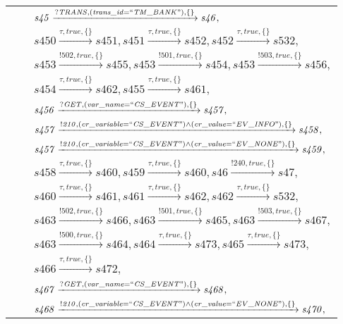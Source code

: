 \begin{tabular}{lcp{350px}}
& & $\mathit{s45}\xrightarrow{\mathit{?TRANS}, \mathit{(trans\_id = ``TM\_BANK")}, \{\}}\mathit{s46},$ \\
& & $\mathit{s450}\xrightarrow{\mathit{\tau}, \mathit{true}, \{\}}\mathit{s451},\mathit{s451}\xrightarrow{\mathit{\tau}, \mathit{true}, \{\}}\mathit{s452},\mathit{s452}\xrightarrow{\mathit{\tau}, \mathit{true}, \{\}}\mathit{s532},$ \\
& & $\mathit{s453}\xrightarrow{\mathit{!502}, \mathit{true}, \{\}}\mathit{s455},\mathit{s453}\xrightarrow{\mathit{!501}, \mathit{true}, \{\}}\mathit{s454},\mathit{s453}\xrightarrow{\mathit{!503}, \mathit{true}, \{\}}\mathit{s456},$ \\
& & $\mathit{s454}\xrightarrow{\mathit{\tau}, \mathit{true}, \{\}}\mathit{s462},\mathit{s455}\xrightarrow{\mathit{\tau}, \mathit{true}, \{\}}\mathit{s461},$ \\
& & $\mathit{s456}\xrightarrow{\mathit{?GET}, \mathit{(var\_name = ``CS\_EVENT")}, \{\}}\mathit{s457},$ \\
& & $\mathit{s457}\xrightarrow{\mathit{!210}, \mathit{(cr\_variable = ``CS\_EVENT") \land (cr\_value = ``EV\_INFO")}, \{\}}\mathit{s458},$ \\
& & $\mathit{s457}\xrightarrow{\mathit{!210}, \mathit{(cr\_variable = ``CS\_EVENT") \land (cr\_value = ``EV\_NONE")}, \{\}}\mathit{s459},$ \\
& & $\mathit{s458}\xrightarrow{\mathit{\tau}, \mathit{true}, \{\}}\mathit{s460},\mathit{s459}\xrightarrow{\mathit{\tau}, \mathit{true}, \{\}}\mathit{s460},\mathit{s46}\xrightarrow{\mathit{!240}, \mathit{true}, \{\}}\mathit{s47},$ \\
& & $\mathit{s460}\xrightarrow{\mathit{\tau}, \mathit{true}, \{\}}\mathit{s461},\mathit{s461}\xrightarrow{\mathit{\tau}, \mathit{true}, \{\}}\mathit{s462},\mathit{s462}\xrightarrow{\mathit{\tau}, \mathit{true}, \{\}}\mathit{s532},$ \\
& & $\mathit{s463}\xrightarrow{\mathit{!502}, \mathit{true}, \{\}}\mathit{s466},\mathit{s463}\xrightarrow{\mathit{!501}, \mathit{true}, \{\}}\mathit{s465},\mathit{s463}\xrightarrow{\mathit{!503}, \mathit{true}, \{\}}\mathit{s467},$ \\
& & $\mathit{s463}\xrightarrow{\mathit{!500}, \mathit{true}, \{\}}\mathit{s464},\mathit{s464}\xrightarrow{\mathit{\tau}, \mathit{true}, \{\}}\mathit{s473},\mathit{s465}\xrightarrow{\mathit{\tau}, \mathit{true}, \{\}}\mathit{s473},$ \\
& & $\mathit{s466}\xrightarrow{\mathit{\tau}, \mathit{true}, \{\}}\mathit{s472},$ \\
& & $\mathit{s467}\xrightarrow{\mathit{?GET}, \mathit{(var\_name = ``CS\_EVENT")}, \{\}}\mathit{s468},$ \\
& & $\mathit{s468}\xrightarrow{\mathit{!210}, \mathit{(cr\_variable = ``CS\_EVENT") \land (cr\_value = ``EV\_NONE")}, \{\}}\mathit{s470},$ \\
\end{tabular}

